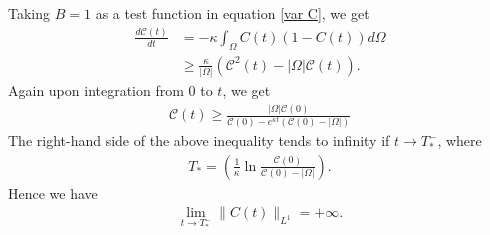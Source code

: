 \documentclass[final,3p,times]{elsarticle}
\theoremstyle{plain}
\theoremstyle{remark}
\theoremstyle{plain}
\theoremstyle{remark}
\begin{document}
Taking $B = 1 $ as a test function in equation \eqref{var C}, we get
\begin{align}
 \frac{d \mathscr C(t)}{d t} &= - \kappa \int_\Omega C(t) (1-C(t)) d\Omega \nonumber
 \\
 &\geq \frac{\kappa}{|\Omega|}\left(\mathscr C^2(t) - |\Omega| \mathscr C(t)\right).
\end{align}
Again upon integration from $0$ to $t$, we get
\begin{align}
    \mathscr C(t) \geq \frac{|\Omega|\mathscr C(0)}{\mathscr C(0)-e^{\kappa t}\left(\mathscr C(0) -|\Omega|\right)}
\end{align}
The right-hand side of the above inequality tends to infinity if $\displaystyle t\to T_*^-$, where 
\begin{align}
T_* =  \left(\frac{1}{\kappa}\ln{\frac{\mathscr C(0)}{\mathscr C(0) - |\Omega|}}\right).
\end{align}Hence we have
\begin{align}
    \lim_{t\to T_*^-} \|C(t)\|_{L^1} = +\infty. \label{eq: blowup time}
\end{align}
\end{document}

